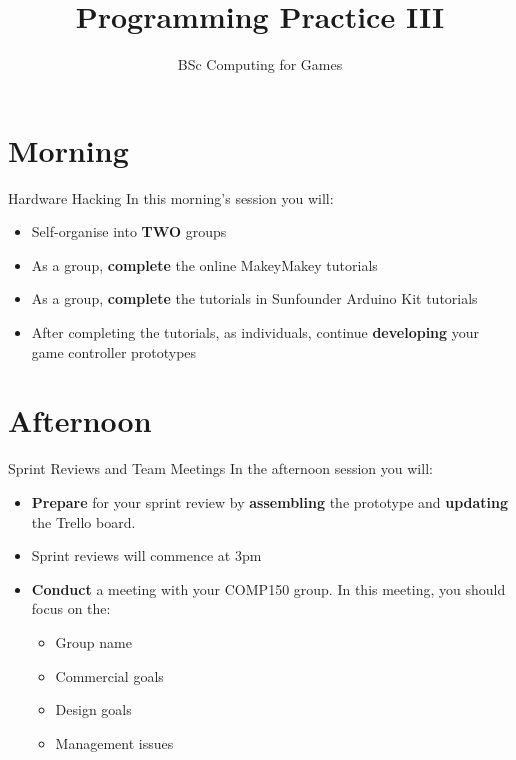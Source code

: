 \documentclass[xcolor={dvipsnames}]{beamer}\usepackage{etoolbox}\newtoggle{printable}\togglefalse{printable}
\begin{document}
\title{Programming Practice III}   
\subtitle{BSc Computing for Games}

\frame{\titlepage} 

\part{Morning}
\frame{\partpage}

\begin{frame}{Hardware Hacking}
	In this morning's session you will:
	
	\begin{itemize}
		\item Self-organise into \textbf{TWO} groups
		\item As a group, \textbf{complete} the online MakeyMakey tutorials
		\item As a group, \textbf{complete} the tutorials in Sunfounder Arduino Kit tutorials
		\item After completing the tutorials, as individuals, continue \textbf{developing} your game controller prototypes
	\end{itemize}
\end{frame}

\part{Afternoon}
\frame{\partpage}

\begin{frame}{Sprint Reviews and Team Meetings}
	In the afternoon session you will:
	
	\begin{itemize}
		\item \textbf{Prepare} for your sprint review by \textbf{assembling} the prototype and \textbf{updating} the Trello board.
		\item Sprint reviews will commence at 3pm
		\item \textbf{Conduct} a meeting with your COMP150 group. In this meeting, you should focus on the:
		\begin{itemize}
			\item Group name
			\item Commercial goals
			\item Design goals
			\item Management issues
		\end{itemize}
	\end{itemize}
\end{frame}


%
\end{document}
